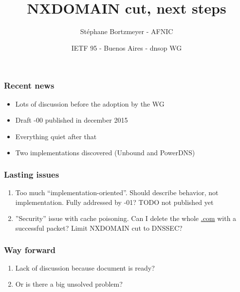 \documentclass[ignorenonframetext]{beamer}
\title{NXDOMAIN cut, next steps}
\author{Stéphane Bortzmeyer - AFNIC}
\date{IETF 95 - Buenos Aires - dnsop WG}
\begin{document}
\begin{frame}
\maketitle  
\end{frame}

\begin{frame}
  \frametitle{Recent news}
  \begin{itemize}
  \item<2->Lots of discussion before the adoption by the WG
  \item<3->Draft -00 published in december 2015
  \item<4->Everything quiet after that
  \item<5->Two implementations discovered (Unbound and PowerDNS)  
  \end{itemize}
\end{frame}

\begin{frame}
  \frametitle{Lasting issues}
  \begin{enumerate}
  \item<2->Too much ``implementation-oriented''. Should describe
    behavior, not implementation. Fully addressed by -01? TODO not
    published yet
  \item<3->''Security'' issue with cache poisoning. Can I delete
    the whole \url{.com} with a successful packet? Limit NXDOMAIN cut to
    DNSSEC?
  \end{enumerate}
\end{frame}

\begin{frame}
  \frametitle{Way forward}
  \begin{enumerate}
  \item<2->Lack of discussion because document is ready?
  \item<3->Or is there a big unsolved problem?
  \end{enumerate}
\end{frame}
\end{document}
